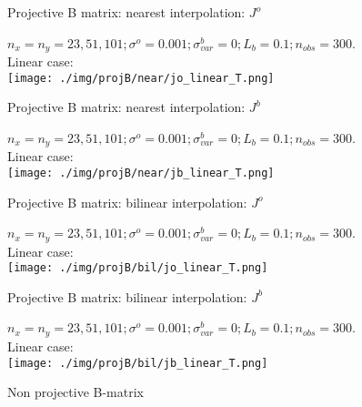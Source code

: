 \documentclass[francais]{beamer}
\begin{document}
\begin{frame}{Projective B matrix: nearest interpolation: $J^o$}
\begin{center}
$n_x=n_y=23,51,101 ; \sigma^o = 0.001 ; \sigma^b_{var} = 0 ; L_b = 0.1 ; n_{obs}=300$.\\
Linear case:\\
\texttt{[image: ./img/projB/near/jo\_linear\_T.png]}
\end{center}
\end{frame}
\begin{frame}{Projective B matrix: nearest interpolation: $J^b$}
\begin{center}
$n_x=n_y=23,51,101 ; \sigma^o = 0.001 ; \sigma^b_{var} = 0 ; L_b = 0.1 ; n_{obs}=300$.\\
Linear case:\\
\texttt{[image: ./img/projB/near/jb\_linear\_T.png]}
\end{center}
\end{frame}

\begin{frame}{Projective B matrix: bilinear interpolation: $J^o$}
\begin{center}
$n_x=n_y=23,51,101 ; \sigma^o = 0.001 ; \sigma^b_{var} = 0 ; L_b = 0.1 ; n_{obs}=300$.\\
Linear case:\\
\texttt{[image: ./img/projB/bil/jo\_linear\_T.png]}
\end{center}
\end{frame}

\begin{frame}{Projective B matrix: bilinear interpolation: $J^b$}
\begin{center}
$n_x=n_y=23,51,101 ; \sigma^o = 0.001 ; \sigma^b_{var} = 0 ; L_b = 0.1 ; n_{obs}=300$.\\
Linear case:\\
\texttt{[image: ./img/projB/bil/jb\_linear\_T.png]}
\end{center}
\end{frame}



\begin{frame}
\begin{center}
\huge{Non projective B-matrix}
\end{center}
\end{frame}
\end{document}
